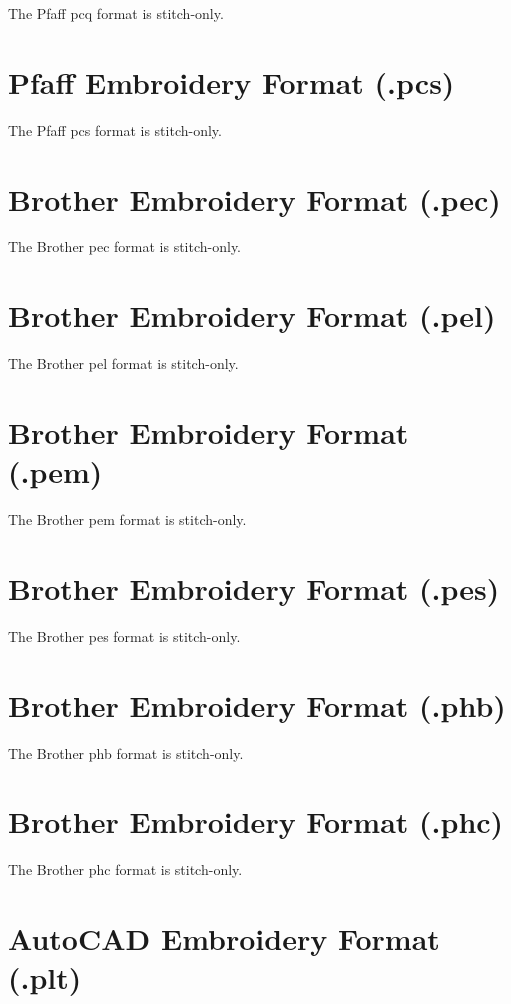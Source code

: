 The Pfaff pcq format is stitch-only.

\section{Pfaff Embroidery Format (.pcs)}

The Pfaff pcs format is stitch-only.

\section{Brother Embroidery Format (.pec)}

The Brother pec format is stitch-only.

\section{Brother Embroidery Format (.pel)}

The Brother pel format is stitch-only.

\section{Brother Embroidery Format (.pem)}

The Brother pem format is stitch-only.

\section{Brother Embroidery Format (.pes)}

The Brother pes format is stitch-only.

\section{Brother Embroidery Format (.phb)}

The Brother phb format is stitch-only.

\section{Brother Embroidery Format (.phc)}

The Brother phc format is stitch-only.

\section{AutoCAD Embroidery Format (.plt)}

